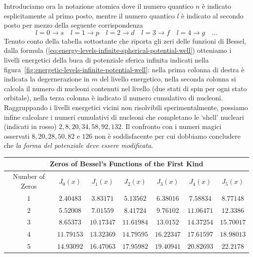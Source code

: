 Introduciamo ora la notazione atomica dove il numero quantico $n$ è indicato esplicitamente al primo posto, mentre il numero quantico $l$ è indicato al secondo posto per mezzo della seguente corrispondenza
\[
l = 0 \to s \quad l = 1 \to p \quad l = 2 \to d \quad l = 3 \to f
\quad l = 4 \to g \quad \dots
\]
Tenuto conto della tabella sottostante che riporta gli zeri delle funzioni di Bessel, dalla formula (\ref{eq:energy-levels-infinite-spherical-potential-well}) otteniamo i livelli energetici della buca di potenziale sferica infinita indicati nella figura~\ref{fig:energetic-levels-infinite-potential-well}: nella prima colonna di destra è indicata la degernerazione in $m$ del livello energetico, nella seconda colonna si calcola il numero di nucleoni contenuti nel livello (due stati di spin per ogni stato orbitale), nella terza colonna è indicato il numero cumulativo di nucleoni. Raggruppando i livelli energetici vicini non risolvibili sperimentalmente, possiamo infine calcolare i numeri cumulativi di nucleoni che completano le ‘shell’ nucleari (indicati in rosso) $2, 8, 20, 34, 58, 92, 132$. Il confronto con i numeri magici osservati $8, 20, 28, 50, 82$ e $126$ non è soddisfacente per cui dobbiamo concludere che \emph{la forma del potenziale deve essere modificata}.
\begin{table}[h]
	\begin{tabular}{|ccccccc|}
		\hline
		\multicolumn{7}{|c|}{Zeros of Bessel’s Functions of the First Kind} \\ \hline
		\multicolumn{1}{|c|}{Number of Zeros} & \multicolumn{1}{c|}{$J_{0}(x)$} & \multicolumn{1}{c|}{$J_{1}(x)$} & \multicolumn{1}{c|}{$J_{2}(x)$} & \multicolumn{1}{c|}{$J_{3}(x)$} & \multicolumn{1}{c|}{$J_{4}(x)$} & $J_{5}(x)$ \\ \hline
		\multicolumn{1}{|c|}{$1$} & \multicolumn{1}{c|}{$2.40483$} & \multicolumn{1}{c|}{$3.83171$} & \multicolumn{1}{c|}{$5.13562$} & \multicolumn{1}{c|}{$6.38016$} & \multicolumn{1}{c|}{$7.58834$} & $8.77148$ \\ \hline
		\multicolumn{1}{|c|}{$2$} & \multicolumn{1}{c|}{$5.52008$} & \multicolumn{1}{c|}{$7.01559$} & \multicolumn{1}{c|}{$8.41724$} & \multicolumn{1}{c|}{$9.76102$} & \multicolumn{1}{c|}{$11.06471$} & $12.3386$ \\ \hline
		\multicolumn{1}{|c|}{$3$} & \multicolumn{1}{c|}{$8.65373$} & \multicolumn{1}{c|}{$10.17347$} & \multicolumn{1}{c|}{$11.61984$} & \multicolumn{1}{c|}{$13.0152$} & \multicolumn{1}{c|}{$14.37254$} & $15.70017$ \\ \hline
		\multicolumn{1}{|c|}{$4$} & \multicolumn{1}{c|}{$11.79153$} & \multicolumn{1}{c|}{$13.32369$} & \multicolumn{1}{c|}{$14.79595$} & \multicolumn{1}{c|}{$16.22347$} & \multicolumn{1}{c|}{$17.61597$} & $18.98013$ \\ \hline
		\multicolumn{1}{|c|}{$5$} & \multicolumn{1}{c|}{$14.93092$} & \multicolumn{1}{c|}{$16.47063$} & \multicolumn{1}{c|}{$17.95982$} & \multicolumn{1}{c|}{$19.40941$} & \multicolumn{1}{c|}{$20.82693$} & $22.2178$ \\ \hline
	\end{tabular}
\end{table}
\bigskip

